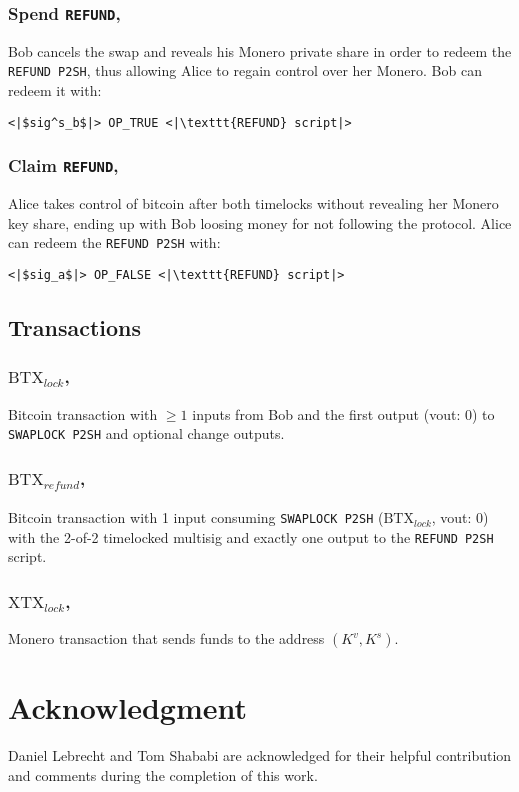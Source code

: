 \documentclass{llncs}
\begin{document}
\subsubsection{Spend \texttt{REFUND},}
Bob cancels the swap and reveals his Monero private share in order to redeem the \texttt{REFUND P2SH}, thus allowing Alice to regain control over her Monero. Bob can redeem it with:

\begin{verbatim}
<|$sig^s_b$|> OP_TRUE <|\texttt{REFUND} script|>
\end{verbatim}

\subsubsection{Claim \texttt{REFUND},}
Alice takes control of bitcoin after both timelocks without revealing her Monero key share, ending up with Bob loosing money for not following the protocol. Alice can redeem the \texttt{REFUND P2SH} with:

\begin{verbatim}
<|$sig_a$|> OP_FALSE <|\texttt{REFUND} script|>
\end{verbatim}

\subsection{Transactions}
\subsubsection{$\text{BTX}_\textit{lock}$,}
Bitcoin transaction with $\geq 1$ inputs from Bob and the first output (vout: 0) to \texttt{SWAPLOCK P2SH} and optional change outputs.

\subsubsection{$\text{BTX}_\textit{refund}$,}
Bitcoin transaction with 1 input consuming \texttt{SWAPLOCK P2SH} ($\text{BTX}_\textit{lock}$, vout: 0) with the 2-of-2 timelocked multisig and exactly one output to the \texttt{REFUND P2SH} script.

\subsubsection{$\text{XTX}_\textit{lock}$,}
Monero transaction that sends funds to the address $(K^v,K^s)$.

\section{Acknowledgment} Daniel Lebrecht and Tom Shababi are acknowledged for their helpful contribution and comments during the completion of this work.

%
%
\printbibliography
\end{document}
